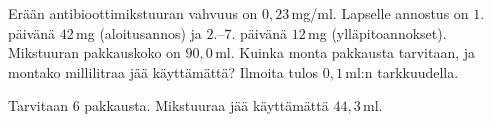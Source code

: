 \begin{tehtavasivu}
\begin{tehtava}
Erään antibioottimikstuuran vahvuus on $0,23$\,mg/ml. Lapselle annostus on $1.$ päivänä $42$\,mg (aloitusannos) 
ja $2$.--$7$. päivänä $12$\,mg (ylläpitoannokset). Mikstuuran pakkauskoko on $90,0$\,ml. Kuinka monta pakkausta tarvitaan, ja montako millilitraa jää käyttämättä? Ilmoita tulos $0,1$\,ml:n tarkkuudella.
 \begin{vastaus}
Tarvitaan $6$ pakkausta. Mikstuuraa jää käyttämättä $44,3$\,ml.
 \end{vastaus}
\end{tehtava}


\end{tehtavasivu}
